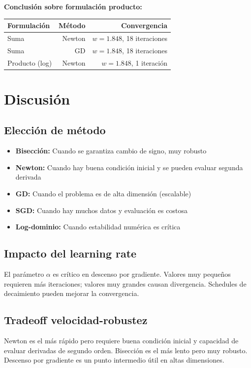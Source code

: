 \documentclass[12pt,a4paper]{article}
\begin{document}
\textbf{Conclusión sobre formulación producto:}
\begin{center}
\begin{tabular}{lrr}
\toprule
Formulación & Método & Convergencia \\
\midrule
Suma & Newton & $w=1.848$, 18 iteraciones \\
Suma & GD & $w=1.848$, 18 iteraciones \\
Producto (log) & Newton & $w=1.848$, 1 iteración \\
\bottomrule
\end{tabular}
\end{center}

\section{Discusión}
\subsection{Elección de método}
\begin{itemize}
    \item \textbf{Bisección:} Cuando se garantiza cambio de signo, muy robusto
    \item \textbf{Newton:} Cuando hay buena condición inicial y se pueden evaluar segunda derivada
    \item \textbf{GD:} Cuando el problema es de alta dimensión (escalable)
    \item \textbf{SGD:} Cuando hay muchos datos y evaluación es costosa
    \item \textbf{Log-dominio:} Cuando estabilidad numérica es crítica
\end{itemize}

\subsection{Impacto del learning rate}
El parámetro $\alpha$ es crítico en descenso por gradiente. Valores muy pequeños requieren más iteraciones; valores muy grandes causan divergencia. Schedules de decaimiento pueden mejorar la convergencia.

\subsection{Tradeoff velocidad-robustez}
Newton es el más rápido pero requiere buena condición inicial y capacidad de evaluar derivadas de segundo orden. Bisección es el más lento pero muy robusto. Descenso por gradiente es un punto intermedio útil en altas dimensiones.
\end{document}
